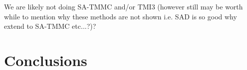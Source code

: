 \documentclass[letterpaper,twocolumn,amsmath,amssymb,pre,aps,10pt]{revtex4-1}
\newcommand{\blue}[1]{{\bf \color{blue} #1}}
\newcommand{\jpsays}[1]{{\color{red} [\blue{Jordan:} \emph{#1}]}}
\begin{document}
We are likely not doing SA-TMMC and/or TMI3 (however still may be worth
while to mention why these methods are not shown i.e. SAD is so good
why extend to SA-TMMC etc...?)?


\section{Conclusions}




\end{document}
